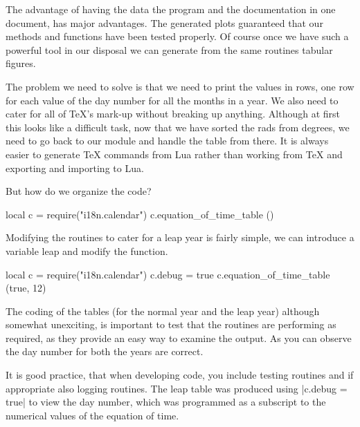 The advantage of having the data the program and the documentation in one document, has major advantages. The generated plots guaranteed that our methods and functions have been tested properly. Of course once we have such a powerful tool in our disposal we can generate from the same routines tabular figures. 



The problem we need to solve is that we need to print the values in rows, one row for each value of the day number for all the months in a year. We also need to cater for all of TeX's mark-up without breaking up anything. Although at first this looks like a difficult task, now that we have sorted the rads from degrees, we need to go back to our module and handle the table from there. It is always easier to generate TeX commands from Lua rather than working from TeX and exporting and importing to Lua.

But how do we organize the code? 


\begin{scriptexample}{}{}
\bgroup
\scriptsize
\begin{luacode}
local c = require("i18n.calendar") 
c.equation_of_time_table ()
\end{luacode}
\egroup
\end{scriptexample}

Modifying the routines to cater for a leap year is fairly simple, we can introduce a variable leap and modify the  function. 


\bgroup
\footnotesize
\begin{luacode}
local c = require("i18n.calendar") 
c.debug = true
c.equation_of_time_table (true, 12)
\end{luacode}
\egroup


The coding of the tables (for the normal year and the leap year) although somewhat unexciting, is important to test that the routines are performing as required, as they provide an easy way to examine the output. As you can observe the day number for both the years are correct. 

It is good practice, that when developing code, you include testing routines and if appropriate also logging routines. The leap table was produced using |c.debug = true|  to view the day number, which was programmed as a subscript to the numerical values of the equation of time.

